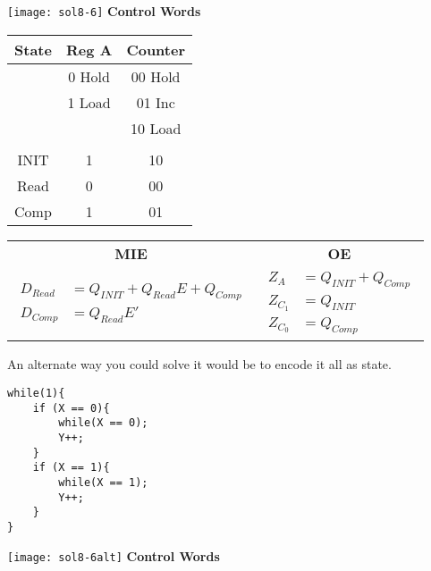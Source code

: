 \begin{enumerate}
\begin{onlysolution}[fragile]
            \texttt{[image: sol8-6]}
            \filbreak
            \textbf{Control Words}

            \begin{tabular}{c|c|c}
                State & Reg A  & Counter \\ \hline
                & 0 Hold & 00 Hold \\ \hline
                & 1 Load & 01 Inc  \\ \hline
                &        & 10 Load \\ \hline
                &        &         \\ \hline
                INIT  & 1      & 10      \\ \hline
                Read  & 0      & 00      \\ \hline
                Comp  & 1      & 01      \\ \hline
            \end{tabular}

            \begin{tabular}{cc}
                \textbf{MIE}                                    & \textbf{OE} \\
                {$
                    \begin{aligned}
                        D_{Read} & = Q_{INIT} + Q_{Read}E + Q_{Comp} \\
                        D_{Comp} & = Q_{Read}E'
                \end{aligned}$} &
                {$
                    \begin{aligned}
                        Z_{A}   & = Q_{INIT} + Q_{Comp} \\
                        Z_{C_1} & = Q_{INIT}            \\
                        Z_{C_0} & = Q_{Comp}
                \end{aligned}$}
            \end{tabular}\par
            An alternate way you could solve it would be to encode it all as state.\par %
              \begin{verbatim}
while(1){
    if (X == 0){
        while(X == 0);
        Y++;
    }
    if (X == 1){
        while(X == 1);
        Y++;
    }
}
\end{verbatim}
            \texttt{[image: sol8-6alt]}
            \filbreak
            \textbf{Control Words}


\end{onlysolution}
\end{enumerate}
